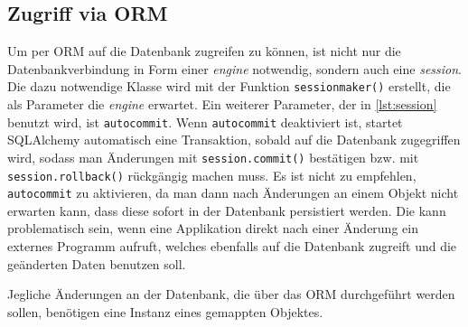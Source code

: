 

\subsection{Zugriff via ORM}

Um per ORM auf die Datenbank zugreifen zu können, ist nicht nur die
Datenbankverbindung in Form einer \emph{engine} notwendig, sondern auch eine
\emph{session}. Die dazu notwendige Klasse wird mit der Funktion
\texttt{sessionmaker()} erstellt, die als Parameter die \emph{engine} erwartet.
Ein weiterer Parameter, der in \autoref{lst:session} benutzt wird, ist
\texttt{autocommit}. Wenn \texttt{autocommit} deaktiviert ist, startet
SQLAlchemy automatisch eine Transaktion, sobald auf die Datenbank zugegriffen
wird, sodass man Änderungen mit \texttt{session.commit()} bestätigen bzw. mit
\texttt{session.rollback()} rückgängig machen muss. Es ist nicht zu empfehlen,
\texttt{autocommit} zu aktivieren, da man dann nach Änderungen an einem Objekt
nicht erwarten kann, dass diese sofort in der Datenbank persistiert werden.
Die kann problematisch sein, wenn eine Applikation direkt nach einer Änderung
ein externes Programm aufruft, welches ebenfalls auf die Datenbank zugreift
und die geänderten Daten benutzen soll.



Jegliche Änderungen an der Datenbank, die über das ORM durchgeführt werden
sollen, benötigen eine Instanz eines gemappten Objektes.

